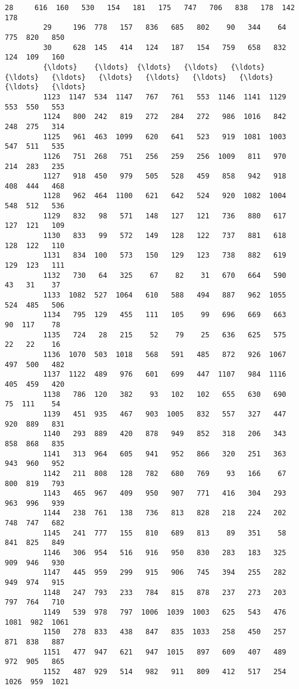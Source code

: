\documentclass[11pt]{article}
\begin{document}
\begin{Verbatim}[commandchars=\\\{\}]
         28     616  160   530   154   181   175   747   706   838   178  142   178   
         29     196  778   157   836   685   802    90   344    64   775  820   850   
         30     628  145   414   124   187   154   759   658   832   124  109   160   
         {\ldots}    {\ldots}  {\ldots}   {\ldots}   {\ldots}   {\ldots}   {\ldots}   {\ldots}   {\ldots}   {\ldots}   {\ldots}  {\ldots}   {\ldots}   
         1123  1147  534  1147   767   761   553  1146  1141  1129   553  550   553   
         1124   800  242   819   272   284   272   986  1016   842   248  275   314   
         1125   961  463  1099   620   641   523   919  1081  1003   547  511   535   
         1126   751  268   751   256   259   256  1009   811   970   214  283   235   
         1127   918  450   979   505   528   459   858   942   918   408  444   468   
         1128   962  464  1100   621   642   524   920  1082  1004   548  512   536   
         1129   832   98   571   148   127   121   736   880   617   127  121   109   
         1130   833   99   572   149   128   122   737   881   618   128  122   110   
         1131   834  100   573   150   129   123   738   882   619   129  123   111   
         1132   730   64   325    67    82    31   670   664   590    43   31    37   
         1133  1082  527  1064   610   588   494   887   962  1055   524  485   506   
         1134   795  129   455   111   105    99   696   669   663    90  117    78   
         1135   724   28   215    52    79    25   636   625   575    22   22    16   
         1136  1070  503  1018   568   591   485   872   926  1067   497  500   482   
         1137  1122  489   976   601   699   447  1107   984  1116   405  459   420   
         1138   786  120   382    93   102   102   655   630   690    75  111    54   
         1139   451  935   467   903  1005   832   557   327   447   920  889   831   
         1140   293  889   420   878   949   852   318   206   343   858  868   835   
         1141   313  964   605   941   952   866   320   251   363   943  960   952   
         1142   211  808   128   782   680   769    93   166    67   800  819   793   
         1143   465  967   409   950   907   771   416   304   293   963  996   939   
         1144   238  761   138   736   813   828   218   224   202   748  747   682   
         1145   241  777   155   810   689   813    89   351    58   841  825   849   
         1146   306  954   516   916   950   830   283   183   325   909  946   930   
         1147   445  959   299   915   906   745   394   255   282   949  974   915   
         1148   247  793   233   784   815   878   237   273   203   797  764   710   
         1149   539  978   797  1006  1039  1003   625   543   476  1081  982  1061   
         1150   278  833   438   847   835  1033   258   450   257   871  838   887   
         1151   477  947   621   947  1015   897   609   407   489   972  905   865   
         1152   487  929   514   982   911   809   412   517   254  1026  959  1021   
         

\end{Verbatim}
\end{document}
